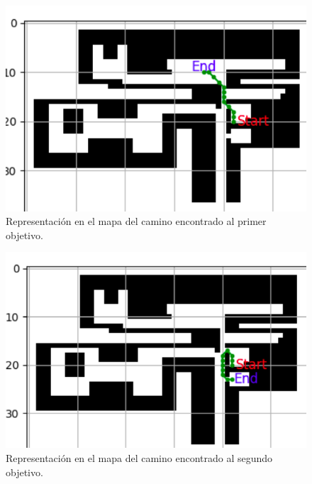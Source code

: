 \begin{figure}[H]
  \centering
  \includegraphics[scale=0.4]{figs/path1} %
  \caption{ Representación en el mapa del camino encontrado al primer objetivo.}
  \label{fig:vals2}
\end{figure} 

\begin{figure}[H]
  \centering
  \includegraphics[scale=0.4]{figs/path2} %
  \caption{ Representación en el mapa del camino encontrado al segundo objetivo.}
  \label{fig:vals2}
\end{figure} 

